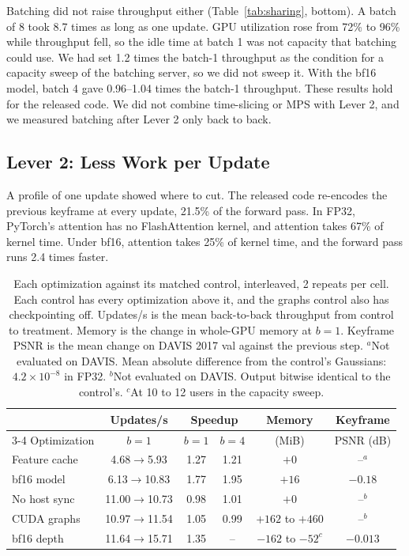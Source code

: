 Batching did not raise throughput either (Table~\ref{tab:sharing}, bottom).
A batch of 8 took 8.7 times as long as one update. %
GPU utilization rose from 72\% to 96\% while throughput fell, so the idle time at batch 1 was not capacity that batching could use. %
We had set 1.2 times the batch-1 throughput as the condition for a capacity sweep of the batching server, so we did not sweep it. %
With the bf16 model, batch 4 gave 0.96--1.04 times the batch-1 throughput. %
These results hold for the released code.
We did not combine time-slicing or MPS with Lever 2, and we measured batching after Lever 2 only back to back.

\subsection{Lever 2: Less Work per Update}

A profile of one update showed where to cut. %
The released code re-encodes the previous keyframe at every update, 21.5\% of the forward pass. %
In FP32, PyTorch's attention has no FlashAttention kernel, and attention takes 67\% of kernel time. %
Under bf16, attention takes 25\% of kernel time, and the forward pass runs 2.4 times faster. %

\begin{table}[t]
\centering
\footnotesize
\setlength{\tabcolsep}{2.5pt}
\begin{tabular}{@{}lccccc@{}}
\toprule
 & Updates/s & \multicolumn{2}{c}{Speedup} & Memory & Keyframe \\
\cmidrule(lr){3-4}
Optimization & $b=1$ & $b=1$ & $b=4$ & (MiB) & PSNR (dB) \\
\midrule
Feature cache & 4.68$\to$5.93 & 1.27 & 1.21 & $+0$ & --$^{a}$ \\ %
bf16 model & 6.13$\to$10.83 & 1.77 & 1.95 & $+16$ & $-0.18$ \\ %
No host sync & 11.00$\to$10.73 & 0.98 & 1.01 & $+0$ & --$^{b}$ \\ %
CUDA graphs & 10.97$\to$11.54 & 1.05 & 0.99 & $+162$ to $+460$ & --$^{b}$ \\ %
bf16 depth & 11.64$\to$15.71 & 1.35 & -- & $-162$ to $-52^{c}$ & $-0.013$ \\ %
\bottomrule
\end{tabular}
\caption{Each optimization against its matched control, interleaved, 2 repeats per cell. %
Each control has every optimization above it, and the graphs control also has checkpointing off.
Updates/s is the mean back-to-back throughput from control to treatment.
Memory is the change in whole-GPU memory at $b=1$.
Keyframe PSNR is the mean change on DAVIS 2017 val against the previous step.
$^{a}$Not evaluated on DAVIS. Mean absolute difference from the control's Gaussians: $4.2\times10^{-8}$ in FP32. %
$^{b}$Not evaluated on DAVIS. Output bitwise identical to the control's. %
$^{c}$At 10 to 12 users in the capacity sweep.} %
\label{tab:ablation}
\end{table}

